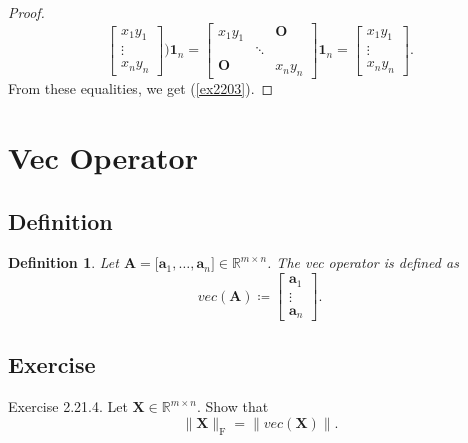 \documentclass{article}
\theoremstyle{plain}
\newtheorem{dfn}{Definition}[subsection]
\begin{document}
\begin{proof}
\begin{equation*}
\begin{bmatrix}
			x_1 y_1 \\
			\vdots \\
			x_n y_n
		\end{bmatrix}
		) \bm{1}_n
		=
		\begin{bmatrix}
			x_1 y_1 &  & \bm{O} \\
			 & \ddots &  \\
			\bm{O} &  & x_n y_n
		\end{bmatrix}
		\bm{1}_n
		=
		\begin{bmatrix}
			x_1 y_1 \\
			\vdots \\
			x_n y_n
		\end{bmatrix} .
	\end{equation*}
	From these equalities, we get (\ref{ex2203}).
\end{proof}


\section{Vec Operator}

\subsection{Definition}

\begin{dfn}
	Let $\bm{A} = \lbrack \bm{a}_1 , \ldots , \bm{a}_n \rbrack \in \mathbb{R}^{m \times n}$.
	The vec operator is defined as
	\begin{equation}
		\label{dfn_vec}
		vec(\bm{A}) \coloneq
		\begin{bmatrix}
			\bm{a}_1 \\
			\vdots \\
			\bm{a}_n
		\end{bmatrix} .
	\end{equation}
\end{dfn}

\subsection{Exercise}

\begin{itembox}[l]{Exercise 2.21.4.}
	Let $\bm{X} \in \mathbb{R}^{m \times n}$.
	Show that
	\begin{equation}
		\label{ex2214}
		\lVert \bm{X} \rVert_{\mathrm{F}} = \lVert vec(\bm{X}) \rVert .
	\end{equation}
\end{itembox}
\end{document}
